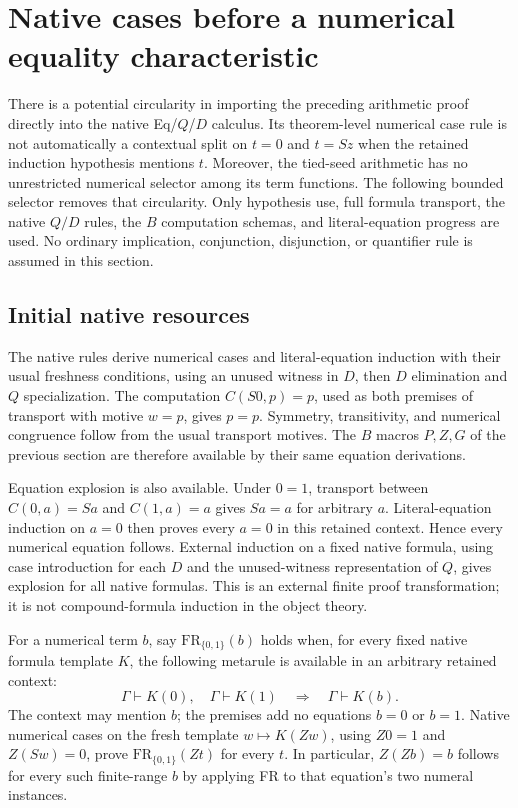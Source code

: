\section{Native cases before a numerical equality characteristic}
\label{sec:monus-native-bootstrap}

There is a potential circularity in importing the preceding arithmetic
proof directly into the native Eq/$Q$/$D$ calculus. Its theorem-level
numerical case rule is not automatically a contextual split on $t=0$
and $t=Sz$ when the retained induction hypothesis mentions $t$. Moreover,
the tied-seed arithmetic has no unrestricted numerical selector among its
term functions. The following bounded selector removes that circularity.
Only hypothesis use, full formula transport, the native $Q/D$ rules,
the $B$ computation schemas, and literal-equation progress are used.
No ordinary implication, conjunction, disjunction, or quantifier rule is
assumed in this section.

\subsection{Initial native resources}
The native rules derive numerical cases and literal-equation induction
with their usual freshness conditions, using an unused witness in $D$,
then $D$ elimination and $Q$ specialization. The computation
$C(S0,p)=p$, used as both premises of transport with motive $w=p$,
gives $p=p$. Symmetry, transitivity, and numerical congruence follow
from the usual transport motives. The $B$ macros $P,Z,G$ of the previous
section are therefore available by their same equation derivations.

Equation explosion is also available. Under $0=1$, transport between
$C(0,a)=Sa$ and $C(1,a)=a$ gives $Sa=a$ for arbitrary $a$.
Literal-equation induction on $a=0$ then proves every $a=0$ in this
retained context. Hence every numerical equation follows. External
induction on a fixed native formula, using case introduction for each
$D$ and the unused-witness representation of $Q$, gives explosion for
all native formulas. This is an external finite proof transformation;
it is not compound-formula induction in the object theory.

For a numerical term $b$, say $\mathrm{FR}_{\{0,1\}}(b)$ holds when,
for every fixed native formula template $K$, the following metarule is
available in an arbitrary retained context:
\[
 \Gamma\vdash K(0),\quad\Gamma\vdash K(1)
       \quad\Longrightarrow\quad\Gamma\vdash K(b).
 \tag{FR}\label{monus:native-FR}
\]
The context may mention $b$; the premises add no equations $b=0$ or
$b=1$. Native numerical cases on the fresh template $w\mapsto K(Zw)$,
using $Z0=1$ and $Z(Sw)=0$, prove
$\mathrm{FR}_{\{0,1\}}(Zt)$ for every $t$. In particular,
$Z(Zb)=b$ follows for every such finite-range $b$ by applying FR to
that equation's two numeral instances.

